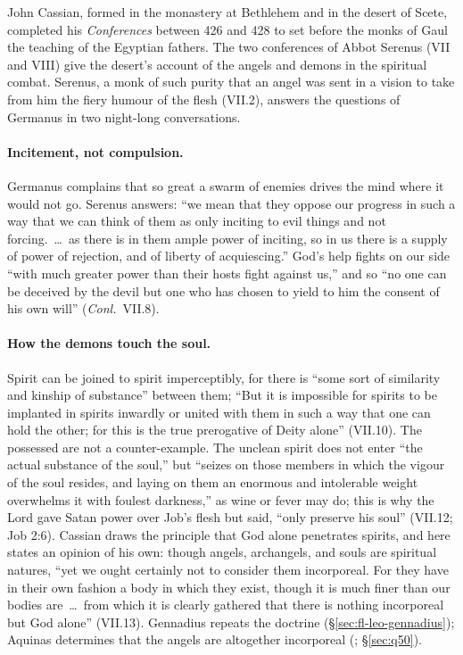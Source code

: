 John Cassian, formed in the monastery at Bethlehem and in the desert of
Scete, completed his \emph{Conferences} between 426 and 428 to set before
the monks of Gaul the teaching of the Egyptian fathers. The two
conferences of Abbot Serenus (VII and VIII) give the desert's account of
the angels and demons in the spiritual combat. Serenus, a monk of
such purity that an angel was sent in a vision to take from him the
fiery humour of the flesh (VII.2), answers the questions of Germanus in
two night-long conversations.

\paragraph{Incitement, not compulsion.} Germanus complains that so great a
swarm of enemies drives the mind where it would not go. Serenus answers:
``we mean that they oppose our progress in such a way that we can think of
them as only inciting to evil things and not forcing.~\dots\ as there is
in them ample power of inciting, so in us there is a supply of power of
rejection, and of liberty of acquiescing.'' God's help fights on our side
``with much greater power than their hosts fight against us,'' and so ``no
one can be deceived by the devil but one who has chosen to yield to him
the consent of his own will'' (\emph{Conl.}\ VII.8).

\paragraph{How the demons touch the soul.} Spirit can be joined to spirit
imperceptibly, for there is ``some sort of similarity and kinship of
substance'' between them; ``But it is impossible for spirits to be
implanted in spirits inwardly or united with them in such a way that one
can hold the other; for this is the true prerogative of Deity alone''
(VII.10). The possessed are not a counter-example. The unclean spirit does
not enter ``the actual substance of the soul,'' but ``seizes on those
members in which the vigour of the soul resides, and laying on them an
enormous and intolerable weight overwhelms it with foulest darkness,'' as
wine or fever may do; this is why the Lord gave Satan power over Job's
flesh but said, ``only preserve his soul'' (VII.12; Job 2:6). Cassian
draws the principle that God alone penetrates spirits, and here states an
opinion of his own: though angels, archangels, and souls are spiritual
natures, ``yet we ought certainly not to consider them incorporeal. For
they have in their own fashion a body in which they exist, though it is
much finer than our bodies are~\dots\ from which it is clearly gathered
that there is nothing incorporeal but God alone'' (VII.13). Gennadius
repeats the doctrine (\S\ref{sec:fl-leo-gennadius}); Aquinas determines
that the angels are altogether incorporeal (;
\S\ref{sec:q50}).

